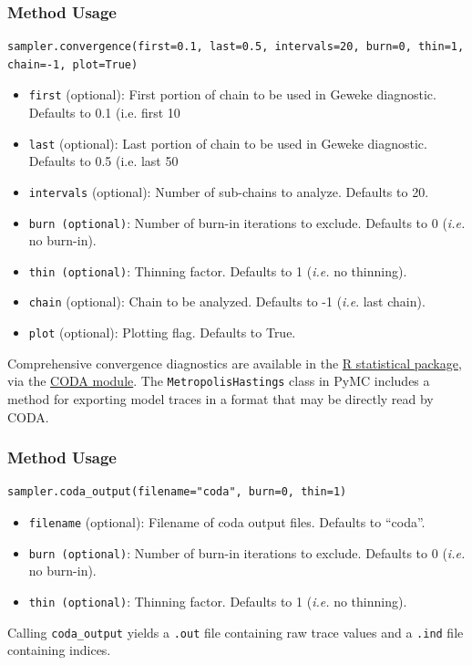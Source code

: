 \documentclass[]{book}
\begin{document}
\subsubsection{Method Usage}
\begin{verbatim}
sampler.convergence(first=0.1, last=0.5, intervals=20, burn=0, thin=1, chain=-1, plot=True)
\end{verbatim}
\begin{itemize}

\item \verb=first= (optional): First portion of chain to be used in Geweke diagnostic. Defaults to 0.1 (i.e. first 10%

\item \verb=last= (optional): Last portion of chain to be used in Geweke diagnostic. Defaults to 0.5 (i.e. last 50%

\item \verb=intervals= (optional): Number of sub-chains to analyze. Defaults to 20.

\item \verb=burn (optional)=: Number of burn-in iterations to exclude. Defaults to 0 (\emph{i.e.} no burn-in).

\item \verb=thin (optional)=: Thinning factor. Defaults to 1 (\emph{i.e.} no thinning).

\item \verb=chain= (optional): Chain to be analyzed. Defaults to -1 (\emph{i.e}. last chain).

\item \verb=plot= (optional): Plotting flag. Defaults to True.
\end{itemize}
Comprehensive convergence diagnostics are available in the \href{http://lib.stat.cmu.edu/R/CRAN/}{R statistical package}, via the \href{http://www-fis.iarc.fr/coda/}{CODA module}. The \verb=MetropolisHastings= class in PyMC includes a method for exporting model traces in a format that may be directly read by CODA.

\subsubsection{Method Usage}
\begin{verbatim}
sampler.coda_output(filename="coda", burn=0, thin=1)
\end{verbatim}
\begin{itemize}

\item \verb=filename= (optional): Filename of coda output files. Defaults to ``coda''.

\item \verb=burn (optional)=: Number of burn-in iterations to exclude. Defaults to 0 (\emph{i.e.} no burn-in).

\item \verb=thin (optional)=: Thinning factor. Defaults to 1 (\emph{i.e.} no thinning).

\end{itemize}
Calling \verb=coda_output= yields a \verb=.out= file containing raw trace values and a \verb=.ind= file containing indices.
\end{document}
